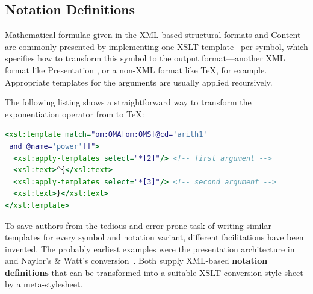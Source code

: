 \documentclass[a4paper]{article}
\def\defemph#1{{\bf{#1}}}
\begin{document}
\subsection{Notation Definitions}\label{sec:notdef}

Mathematical formulae given in the XML-based structural formats {\openmath} and Content
{\mathml} are commonly presented by implementing one XSLT template~\cite{W3C:xslt2} per
symbol, which specifies how to transform this symbol to the output format---another XML
format like Presentation {\mathml}, or a non-XML format like {\TeX}, for example.
Appropriate templates for the arguments are usually applied recursively.

The following listing shows a straightforward way to transform the exponentiation operator
from {\openmath} to {\TeX}:
 
\begin{lstlisting}[language=XSLT,caption=An XSLT presentation template,label=lst:template]
<xsl:template match="om:OMA[om:OMS[@cd='arith1'
 and @name='power']]">
  <xsl:apply-templates select="*[2]"/> <!-- first argument -->
  <xsl:text>^{</xsl:text>
  <xsl:apply-templates select="*[3]"/> <!-- second argument -->
  <xsl:text>}</xsl:text>
</xsl:template>
\end{lstlisting}

To save authors from the tedious and error-prone task of writing similar templates for
every symbol and notation variant, different facilitations have been invented. The
probably earliest examples were the presentation architecture in
{}~\cite{Kohlhase:otormd00} and Naylor's \& Watt's {\openmath}
conversion~\cite{Naylor:conversion}. Both supply XML-based {\defemph{notation
    definitions}} that can be transformed into a suitable XSLT conversion style sheet by a
meta-stylesheet.
\end{document}
